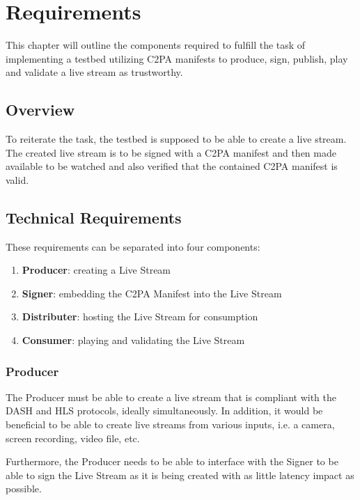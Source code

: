 \chapter{Requirements\label{cha:chapter3}}

This chapter will outline the components required to fulfill the task of implementing a testbed utilizing C2PA manifests to produce, sign, publish, play and validate a live stream as trustworthy.

\section{Overview\label{sec:reqoverview}}

To reiterate the task, the testbed is supposed to be able to create a live stream. The created live stream is to be signed with a C2PA manifest and then made available to be watched and also verified that the contained C2PA manifest is valid. 

\section{Technical Requirements\label{sec:techreq}}

These requirements can be separated into four components:

\begin{enumerate}
    \item \textbf{Producer}: creating a Live Stream
    \item \textbf{Signer}: embedding the C2PA Manifest into the Live Stream
    \item \textbf{Distributer}: hosting the Live Stream for consumption
    \item \textbf{Consumer}: playing and validating the Live Stream
\end{enumerate}

\subsection{Producer}

The Producer must be able to create a live stream that is compliant with the DASH and HLS protocols, ideally simultaneously. In addition, it would be beneficial to be able to create live streams from various inputs, i.e. a camera, screen recording, video file, etc.

Furthermore, the Producer needs to be able to interface with the Signer to be able to sign the Live Stream as it is being created with as little latency impact as possible.

